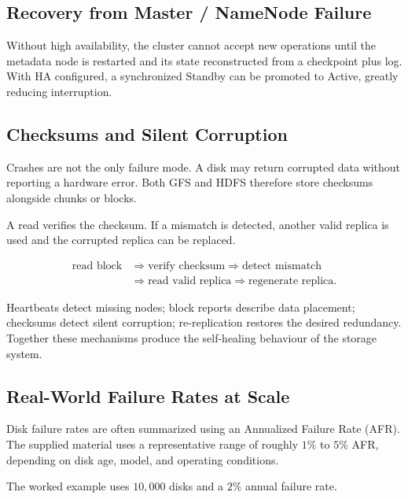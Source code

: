 \documentclass[11pt,a4paper,oneside]{book}
\begin{document}
\subsection{Recovery from Master / NameNode Failure}

Without high availability, the cluster cannot accept new operations until the metadata node is restarted and its state reconstructed from a checkpoint plus log. With HA configured, a synchronized Standby can be promoted to Active, greatly reducing interruption.

\subsection{Checksums and Silent Corruption}

Crashes are not the only failure mode. A disk may return corrupted data without reporting a hardware error. Both GFS and HDFS therefore store checksums alongside chunks or blocks.

A read verifies the checksum. If a mismatch is detected, another valid replica is used and the corrupted replica can be replaced.

\[
\begin{aligned}
\text{read block}
&\Longrightarrow \text{verify checksum}
\Longrightarrow \text{detect mismatch} \\
&\Longrightarrow \text{read valid replica}
\Longrightarrow \text{regenerate replica}.
\end{aligned}
\]

\begin{keyconcept}
Heartbeats detect missing nodes; block reports describe data placement; checksums detect silent corruption; re-replication restores the desired redundancy. Together these mechanisms produce the self-healing behaviour of the storage system.
\end{keyconcept}

\subsection{Real-World Failure Rates at Scale}

Disk failure rates are often summarized using an Annualized Failure Rate (AFR). The supplied material uses a representative range of roughly \(1\%\) to \(5\%\) AFR, depending on disk age, model, and operating conditions.

The worked example uses \(10{,}000\) disks and a \(2\%\) annual failure rate.
\end{document}
